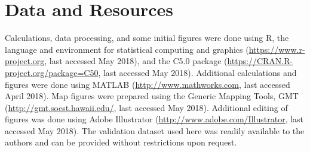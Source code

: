 
\section{Data and Resources}

Calculations, data processing, and some initial figures were done using R, the language and environment for statistical computing and graphics (\url{https://www.r-project.org}, last accessed May 2018), and the C5.0 package (\url{https://CRAN.R-project.org/package=C50}, last accessed May 2018). Additional calculations and figures were done using MATLAB (\url{http://www.mathworks.com}, last accessed April 2018). Map figures were prepared using the Generic Mapping Tools, GMT (\url{http://gmt.soest.hawaii.edu/}, last accessed May 2018). Additional editing of figures was done using Adobe Illustrator (\url{http://www.adobe.com/Illustrator‎}, last accessed May 2018). The validation dataset used here was readily available to the authors and can be provided without restrictions upon request.
